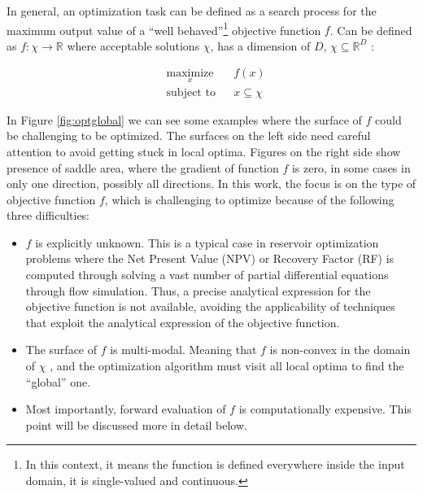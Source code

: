 \documentclass[]{elsarticle} %
\providecommand{\tightlist}{%
  \setlength{\itemsep}{0pt}\setlength{\parskip}{0pt}}
\begin{document}
In general, an optimization task can be defined as a search process for the maximum output value of a ``well behaved''\footnote{In this context, it means the function is defined everywhere inside the input domain, it is single-valued and continuous.} objective function \(f\). Can be defined as \(f: \chi \rightarrow \mathbb{R}\) where acceptable solutions \(\chi\), has a dimension of \(D\), \(\chi \subseteq \mathbb{R}^D\) :

\begin{equation}
\begin{aligned}
& \underset{x}{\text{maximize}}
& & f(x) \\
& \text{subject to}
& & x \subseteq \chi
\end{aligned}
\label{eq:globalopt}
\end{equation}

In Figure \ref{fig:optglobal} we can see some examples where the surface of \(f\) could be challenging to be optimized. The surfaces on the left side need careful attention to avoid getting stuck in local optima. Figures on the right side show presence of saddle area, where the gradient of function \(f\) is zero, in some cases in only one direction, possibly all directions. In this work, the focus is on the type of objective function \(f\), which is challenging to optimize because of the following three difficulties:

\begin{itemize}
\tightlist
\item
  \(f\) is explicitly unknown. This is a typical case in reservoir optimization problems where the Net Present Value (NPV) or Recovery Factor (RF) is computed through solving a vast number of partial differential equations through flow simulation. Thus, a precise analytical expression for the objective function is not available, avoiding the applicability of techniques that exploit the analytical expression of the objective function.
\item
  The surface of \(f\) is multi-modal. Meaning that \(f\) is non-convex in the domain of \(\chi\) , and the optimization algorithm must visit all local optima to find the ``global'' one.
\item
  Most importantly, forward evaluation of \(f\) is computationally expensive. This point will be discussed more in detail below.
\end{itemize}
\end{document}
